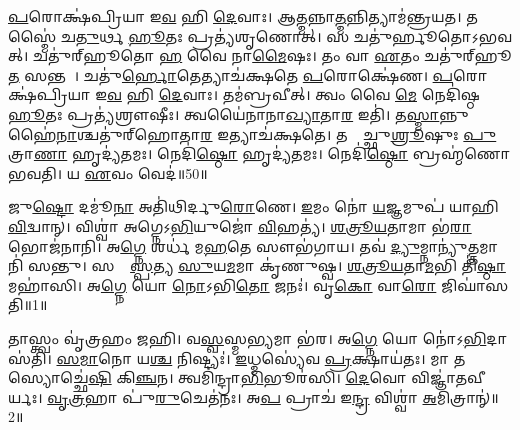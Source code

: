 \ul{𑌪}𑌰𑍋𑌕𑍍𑌷॑𑌪𑍍𑌰𑌿𑌯𑌾 𑌇\ul{𑌵} 𑌹𑌿 \ul{𑌦𑍇}𑌵𑌾𑌃।
𑌆\ul{𑌤𑍍𑌮}𑌨𑍍𑌨𑌾\ul{𑌤𑍍𑌮}𑌨𑍍𑌨𑌿𑌤𑍍𑌯𑌾𑌮॑𑌨𑍍𑌤𑍍𑌰𑌯𑌤।
𑌤𑌸𑍍𑌮𑍈॑ 𑌚\ul{𑌤𑍁}𑌰𑍍𑌥 \ul{𑌹𑍂}𑌤𑌃 𑌪𑍍𑌰𑌤𑍍𑌯॑𑌶𑍃𑌣𑍋𑌤𑍍।
𑌸 𑌚𑌤𑍁॑𑌰𑍍\mbox{}𑌹𑍂𑌤𑍋\-𑌽𑌭𑌵𑌤𑍍।
𑌚𑌤𑍁॑𑌰𑍍‌\mbox{}𑌹𑍂𑌤𑍋 \ul{𑌹} 𑌵𑍈 𑌨𑌾\ul{𑌮𑍈}𑌷𑌃।
𑌤𑌂 𑌵𑌾 \ul{𑌏}𑌤𑌂 𑌚𑌤𑍁॑𑌰𑍍‌\mbox{}𑌹𑍂\ul{𑌤}\ul{} 𑌸𑌨𑍍𑌤𑌮𑍍᳚।
𑌚𑌤𑍁॑\ul{𑌰𑍍𑌹𑍋}𑌤𑍇𑌤𑍍𑌯𑌾𑌚॑𑌕𑍍𑌷𑌤𑍇 \ul{𑌪}𑌰𑍋𑌕𑍍𑌷𑍇॑𑌣।
\ul{𑌪}𑌰𑍋𑌕𑍍𑌷॑𑌪𑍍𑌰𑌿𑌯𑌾 𑌇\ul{𑌵} 𑌹𑌿 \ul{𑌦𑍇}𑌵𑌾𑌃।
𑌤𑌮॑𑌬𑍍𑌰𑌵𑍀𑌤𑍍।
𑌤𑍍𑌵𑌂 𑌵𑍈 \ul{𑌮𑍇} 𑌨𑍇𑌦𑌿॑𑌷𑍍𑌠 \ul{𑌹𑍂}𑌤𑌃 𑌪𑍍𑌰𑌤𑍍𑌯॑𑌶𑍍𑌰𑍗𑌷𑍀𑌃।
𑌤𑍍𑌵𑌯𑍈॑𑌨𑌾𑌨𑌾\ul{𑌖𑍍𑌯𑌾}𑌤𑌾\ul{𑌰} 𑌇𑌤𑌿॑।
𑌤\ul{𑌸𑍍𑌮𑌾}𑌨𑍍𑌨𑍁 𑌹𑍈॑\ul{𑌨𑌾}\ul{}𑌶𑍍𑌚𑌤𑍁॑𑌰𑍍‌\mbox{}𑌹𑍋𑌤𑌾\ul{𑌰} 𑌇𑌤𑍍𑌯𑌾𑌚॑𑌕𑍍𑌷𑌤𑍇।
𑌤𑌸𑍍𑌮𑌾᳚𑌚𑍍𑌛𑍁\ul{𑌶𑍍𑌰𑍂}𑌷𑍁𑌃 \ul{𑌪𑍁}𑌤𑍍𑌰𑌾\ul{𑌣𑌾}\ul{} 𑌹𑍃𑌦𑍍𑌯॑𑌤𑌮𑌃।
𑌨𑍇𑌦𑌿॑\ul{𑌷𑍍𑌠𑍋} 𑌹𑍃𑌦𑍍𑌯॑𑌤𑌮𑌃।
𑌨𑍇𑌦𑌿॑\ul{𑌷𑍍𑌠𑍋} 𑌬𑍍𑌰𑌹𑍍𑌮॑𑌣𑍋 𑌭𑌵𑌤𑌿।
𑌯 \ul{𑌏}𑌵𑌂 𑌵𑍇𑌦॑॥50॥\anuvakamend[\ul{𑌦𑍇}𑌵𑌾𑌃 𑌷𑌡𑍍𑌢𑍂॑𑌤𑍋\-𑌽𑌭\ul{𑌵}𑌤𑍍𑌪𑌞𑍍𑌚॑\ul{𑌹𑍋}𑌤𑍇𑌤𑍍𑌯𑌾𑌚॑𑌕𑍍𑌷𑌤𑍇 \ul{𑌪}𑌰𑍋𑌕𑍍𑌷𑍇॑𑌣𑌾𑌶𑍍𑌰𑍗\ul{𑌷𑍀𑌃} 𑌷𑌟𑍍𑌚॑]




\clearpage
{}
\setcounter{anuvakam}{0}

𑌜𑍁\ul{𑌷𑍍𑌟𑍋} 𑌦𑌮𑍂॑\ul{𑌨𑌾} 𑌅𑌤𑌿॑𑌥𑌿𑌰𑍍𑌦𑍁\ul{𑌰𑍋}𑌣𑍇।
\ul{𑌇}𑌮𑌂 𑌨𑍋॑ \ul{𑌯}𑌜𑍍𑌞𑌮𑍁𑌪॑ 𑌯𑌾𑌹𑌿 \ul{𑌵𑌿}𑌦𑍍𑌵𑌾𑌨𑍍।
𑌵𑌿𑌶𑍍𑌵𑌾॑ 𑌅𑌗𑍍𑌨𑍇\-𑌽\ul{𑌭𑌿}𑌯𑍁𑌜𑍋॑ \ul{𑌵𑌿}𑌹𑌤𑍍𑌯॑।
\ul{𑌶}\ul{𑌤𑍍𑌰𑍂}\ul{𑌯}𑌤𑌾𑌮𑌾 𑌭॑\ul{𑌰𑌾} 𑌭𑍋𑌜॑𑌨𑌾𑌨𑌿।
𑌅\ul{𑌗𑍍𑌨𑍇} 𑌶𑌰𑍍𑌧॑ 𑌮\ul{𑌹}𑌤𑍇 𑌸𑍗𑌭॑𑌗𑌾𑌯।
𑌤𑌵॑ \ul{𑌦𑍍𑌯𑍁}𑌮𑍍𑌨𑌾𑌨𑍍𑌯𑍁॑\ul{𑌤𑍍𑌤}𑌮𑌾𑌨𑌿॑ 𑌸𑌨𑍍𑌤𑍁।
𑌸𑌞𑍍𑌜𑌾᳚\ul{𑌸𑍍𑌪}𑌤𑍍𑌯 \ul{𑌸𑍁}𑌯\ul{𑌮}𑌮𑌾 𑌕𑍃॑𑌣𑍁𑌷𑍍𑌵।
\ul{𑌶}\ul{𑌤𑍍𑌰𑍂}\ul{𑌯}𑌤𑌾\ul{𑌮}𑌭𑌿 𑌤𑌿॑\ul{𑌷𑍍𑌠𑌾} 𑌮𑌹𑌾॑𑌸𑌿।
𑌅\ul{𑌗𑍍𑌨𑍇} 𑌯𑍋 \ul{𑌨𑍋}\-𑌽𑌭𑌿\ul{𑌤𑍋} 𑌜𑌨𑌃॑।
𑌵𑍃\ul{𑌕𑍋} 𑌵𑌾\ul{𑌰𑍋} 𑌜𑌿𑌘𑌾॑𑌸𑌤𑌿॥1॥

𑌤𑌾𑌸𑍍𑌤𑍍𑌵𑌂 𑌵𑍃॑𑌤𑍍𑌰𑌹𑌂 𑌜𑌹𑌿।
𑌵\ul{𑌸𑍍𑌵}𑌸𑍍𑌮\ul{𑌭𑍍𑌯}𑌮𑌾 𑌭॑𑌰।
𑌅\ul{𑌗𑍍𑌨𑍇} 𑌯𑍋 𑌨𑍋॑\-𑌽\ul{𑌭𑌿}𑌦𑌾𑌸॑𑌤𑌿।
\ul{𑌸}\ul{𑌮𑌾}𑌨𑍋 𑌯\ul{𑌶𑍍𑌚} 𑌨𑌿𑌷𑍍𑌟𑍍𑌯𑌃॑।
\ul{𑌇}𑌧𑍍𑌮𑌸𑍍𑌯𑍇॑𑌵 \ul{𑌪𑍍𑌰}𑌕𑍍𑌷𑌾𑌯॑𑌤𑌃।
𑌮𑌾 𑌤𑌸𑍍𑌯𑍋𑌚𑍍𑌛𑍇॑\ul{𑌷𑌿} 𑌕𑌿\ul{𑌞𑍍𑌚}𑌨।
𑌤𑍍𑌵𑌮𑌿॑𑌨𑍍𑌦𑍍𑌰𑌾\ul{𑌭𑌿}𑌭𑍂𑌰॑𑌸𑌿।
\ul{𑌦𑍇}𑌵𑍋 𑌵𑌿𑌜𑍍𑌞𑌾॑𑌤𑌵𑍀𑌰𑍍𑌯𑌃।
\ul{𑌵𑍃}\ul{𑌤𑍍𑌰}𑌹𑌾 𑌪𑍁॑\ul{𑌰𑍁}𑌚𑍇𑌤॑𑌨𑌃।
𑌅\ul{𑌪} 𑌪𑍍𑌰𑌾𑌚॑ 𑌇\ul{𑌨𑍍𑌦𑍍𑌰} 𑌵𑌿𑌶𑍍𑌵𑌾॑ \ul{𑌅}𑌮𑌿𑌤𑍍𑌰𑌾𑌨𑍍॑॥2॥

